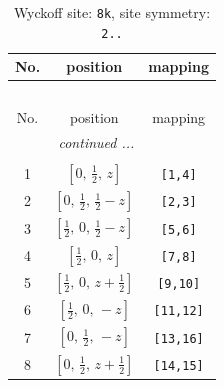 \documentclass[fleqn,8pt]{jsarticle}
\begin{document}
\renewcommand{\arraystretch}{1.2}
\begin{longtable}{ccc}
\caption{Wyckoff site: {\tt 8k}, site symmetry: {\tt 2..}}
 \\
 \hline \hline
No. & position & mapping \\ \hline \endfirsthead

\multicolumn{2}{l}{\tablename\ \thetable{}} \\
 \hline \hline
No. & position & mapping \\ \hline \endhead

 \hline \hline
\multicolumn{2}{r}{\footnotesize\it continued ...} \\ \endfoot

 \hline \hline
\multicolumn{2}{r}{} \\ \endlastfoot

1 & $\left[ 0,\, \frac{1}{2},\, z \right]$ & {\tt [1,4]} \\ \hline
2 & $\left[ 0,\, \frac{1}{2},\, \frac{1}{2} - z \right]$ & {\tt [2,3]} \\ \hline
3 & $\left[ \frac{1}{2},\, 0,\, \frac{1}{2} - z \right]$ & {\tt [5,6]} \\ \hline
4 & $\left[ \frac{1}{2},\, 0,\, z \right]$ & {\tt [7,8]} \\ \hline
5 & $\left[ \frac{1}{2},\, 0,\, z + \frac{1}{2} \right]$ & {\tt [9,10]} \\ \hline
6 & $\left[ \frac{1}{2},\, 0,\, - z \right]$ & {\tt [11,12]} \\ \hline
7 & $\left[ 0,\, \frac{1}{2},\, - z \right]$ & {\tt [13,16]} \\ \hline
8 & $\left[ 0,\, \frac{1}{2},\, z + \frac{1}{2} \right]$ & {\tt [14,15]} \\
\end{longtable}
\renewcommand{\arraystretch}{1.2}
\end{document}
